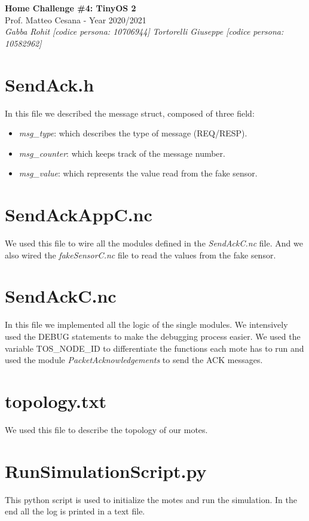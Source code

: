 \documentclass{article}
\begin{document}
\begin{titlepage}
   \begin{center}
      \Huge\textbf{Home Challenge \#4: TinyOS 2}\\
      \vspace{5mm} %
      \Large Prof. Matteo Cesana - Year 2020/2021\\
      \vspace{5mm} %
      \large\textit{Gabba Rohit [codice persona: 10706944]}
      \linebreak
      \large\textit{Tortorelli Giuseppe [codice persona: 10582962]}
      \linebreak
      \linebreak
      \linebreak
      \linebreak
   \end{center}
\end{titlepage}

\pagebreak

\section{SendAck.h}
In this file we described the message struct, composed of three field:

\begin{itemize}
	\item \textit{msg\_type}: which describes the type of message (REQ/RESP).
	\item \textit{msg\_counter}: which keeps track of the message number.
	\item \textit{msg\_value}: which represents the value read from the fake sensor.
\end{itemize}

\section{SendAckAppC.nc}
We used this file to wire all the modules defined in the \textit{SendAckC.nc} file. And we also wired the \textit{fakeSensorC.nc} file to read the values from the fake sensor.


\section{SendAckC.nc}
In this file we implemented all the logic of the single modules. We intensively used the DEBUG statements to make the debugging process easier. \hfill \break
We used the variable TOS\_NODE\_ID to differentiate the functions each mote has to run and used the module \textit{PacketAcknowledgements} to send the ACK messages.

\section{topology.txt}
We used this file to describe the topology of our motes.

\section{RunSimulationScript.py}
This python script is used to initialize the motes and run the simulation. In the end all the log is printed in a text file.
\end{document}
